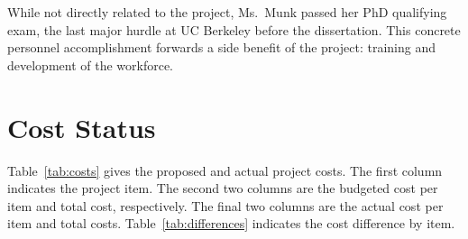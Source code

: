 \documentclass[12pt]{article}
\begin{document}
While not directly related to the project, Ms.\ Munk passed her PhD qualifying exam, the last major hurdle at UC Berkeley before the dissertation. This concrete personnel accomplishment forwards a side benefit of the project: training and development of the workforce. 


\section{Cost Status}
\label{sect::cost}

Table~\ref{tab:costs} gives the proposed and actual project costs. The first column indicates the project item. The second two columns are the budgeted cost per item and total cost, respectively. The final two columns are the actual cost per item and total costs. Table~\ref{tab:differences} indicates the cost difference by item. 
\end{document}

